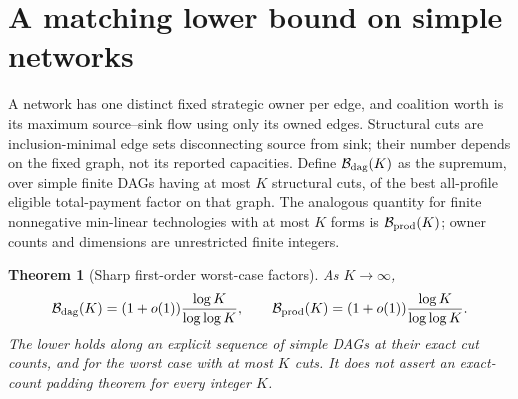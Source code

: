 \documentclass[11pt]{article}
\newtheorem{theorem}{Theorem}[section]
\theoremstyle{definition}\newtheorem{definition}[theorem]{Definition}
\theoremstyle{remark}\newtheorem{remark}[theorem]{Remark}
\begin{document}
\section{A matching lower bound on simple networks}\label{dag:section}
A network has one distinct fixed strategic owner per edge, and coalition
worth is its maximum source--sink flow using only its owned edges. Structural
cuts are inclusion-minimal edge sets disconnecting source from sink; their
number depends on the fixed graph, not its reported capacities. Define
$\mathcal B_{\rm dag}(K)$ as the supremum, over simple finite DAGs having at
most $K$ structural cuts, of the best all-profile eligible total-payment
factor on that graph. The analogous quantity for finite nonnegative
min-linear technologies with at most $K$ forms is $\mathcal B_{\rm prod}(K)$;
owner counts and dimensions are unrestricted finite integers.

\begin{theorem}[Sharp first-order worst-case factors]\label{dag:sharp}
As $K\to\infty$,
\[
 \mathcal B_{\rm dag}(K)=(1+o(1))\frac{\log K}{\log\log K},\qquad
 \mathcal B_{\rm prod}(K)=(1+o(1))\frac{\log K}{\log\log K}.
\]
The lower holds along an explicit sequence of simple DAGs at their exact cut
counts, and for the worst case with \emph{at most} $K$ cuts. It does not
assert an exact-count padding theorem for every integer $K$.
\end{theorem}
\end{document}
